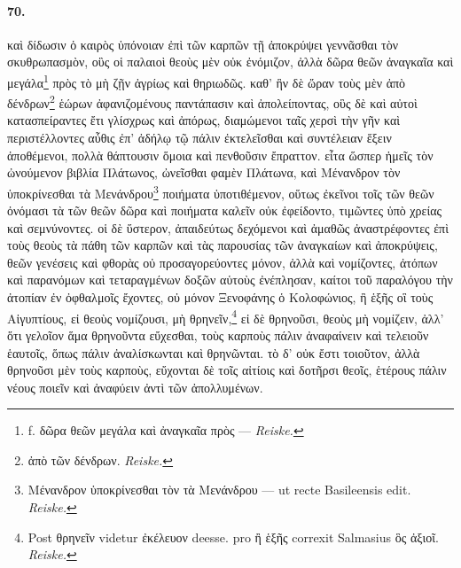 \documentclass[a4paper, 11pt, oneside, polutonikogreek, german]{article}
\begin{document}
\paragraph{70.}
καὶ δίδωσιν ὁ καιρὸς ὑπόνοιαν ἐπὶ τῶν καρπῶν τῇ ἀποκρύψει γεννᾶσθαι τὸν σκυθρωπασμὸν, οὓς οἱ παλαιοὶ θεοὺς μὲν οὐκ ἐνόμιζον, ἀλλὰ δῶρα θεῶν ἀναγκαῖα καὶ μεγάλα\footnote{f. δῶρα θεῶν μεγάλα καὶ ἀναγκαῖα πρὸς --- \emph{Reiske.}} πρὸς τὸ μὴ ζῇν ἀγρίως καὶ θηριωδῶς. καθ' ἣν δὲ ὥραν τοὺς μὲν ἀπὸ δένδρων\footnote{ἀπὸ τῶν δένδρων. \emph{Reiske.}} ἑώρων ἀφανιζομένους παντάπασιν καὶ ἀπολείποντας, οὓς δὲ καὶ αὐτοὶ κατασπείραντες ἔτι γλίσχρως καὶ ἀπόρως, διαμώμενοι ταῖς χερσὶ τὴν γῆν καὶ περιστέλλοντες αὖθις ἐπ' ἀδήλῳ τῷ πάλιν ἐκτελεῖσθαι καὶ συντέλειαν ἕξειν ἀποθέμενοι, πολλὰ θάπτουσιν ὅμοια καὶ πενθοῦσιν ἔπραττον. εἶτα ὥσπερ ἡμεῖς τὸν ὠνούμενον βιβλία Πλάτωνος, ὠνεῖσθαι φαμὲν Πλάτωνα, καὶ Μένανδρον τὸν ὑποκρίνεσθαι τὰ Μενάνδρου\footnote{Μένανδρον ὑποκρίνεσθαι τὸν τὰ Μενάνδρου --- ut recte Basileensis edit. \emph{Reiske.}} ποιήματα ὑποτιθέμενον, οὕτως ἐκεῖνοι τοῖς τῶν θεῶν ὀνόμασι τὰ τῶν θεῶν δῶρα καὶ ποιήματα καλεῖν οὐκ ἐφείδοντο, τιμῶντες ὑπὸ χρείας καὶ σεμνύνοντες. οἱ δὲ ὕστερον, ἀπαιδεύτως δεχόμενοι καὶ ἀμαθῶς ἀναστρέφοντες ἐπὶ τοὺς θεοὺς τὰ πάθη τῶν καρπῶν καὶ τὰς παρουσίας τῶν ἀναγκαίων καὶ ἀποκρύψεις, θεῶν γενέσεις καὶ φθορὰς οὐ προσαγορεύοντες μόνον, ἀλλὰ καὶ νομίζοντες, ἀτόπων καὶ παρανόμων καὶ τεταραγμένων δοξῶν αὑτοὺς ἐνέπλησαν, καίτοι τοῦ παραλόγου τὴν ἀτοπίαν ἐν ὀφθαλμοῖς ἔχοντες, οὐ μόνον Ξενοφάνης ὁ Κολοφώνιος, ἢ ἑξῆς οἳ τοὺς Αἰγυπτίους, εἰ θεοὺς νομίζουσι, μὴ θρηνεῖν,\footnote{Post θρηνεῖν videtur ἐκέλευον deesse. pro ἢ ἑξῆς correxit Salmasius ὃς ἀξιοῖ. \emph{Reiske.}} εἰ δὲ θρηνοῦσι, θεοὺς μὴ νομίζειν, ἀλλ' ὅτι γελοῖον ἅμα θρηνοῦντα εὔχεσθαι, τοὺς καρποὺς πάλιν ἀναφαίνειν καὶ τελειοῦν ἑαυτοῖς, ὅπως πάλιν ἀναλίσκωνται καὶ θρηνῶνται. τὸ δ' οὐκ ἔστι τοιοῦτον, ἀλλὰ θρηνοῦσι μὲν τοὺς καρποὺς, εὔχονται δὲ τοῖς αἰτίοις καὶ δοτῆρσι θεοῖς, ἑτέρους πάλιν νέους ποιεῖν καὶ ἀναφύειν ἀντὶ τῶν ἀπολλυμένων.
\end{document}

